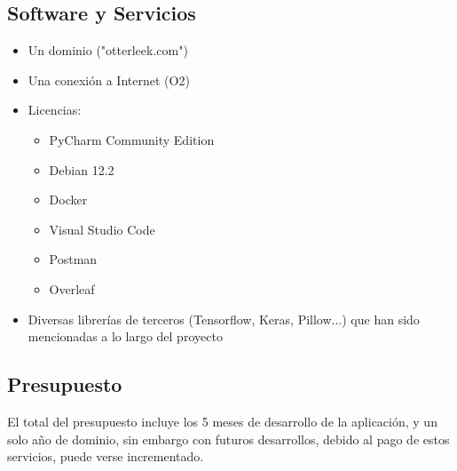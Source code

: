 \documentclass{article}
\begin{document}
\subsection{Software y Servicios}
\begin{itemize}
	\item Un dominio ("otterleek.com")
	\item Una conexión a Internet (O2)
	\item Licencias:
	\begin{itemize}
    	\item PyCharm Community Edition
    	\item Debian 12.2
    	\item Docker
    	\item Visual Studio Code
    	\item Postman
    	\item Overleaf
	\end{itemize}
	\item Diversas librerías de terceros (Tensorflow, Keras, Pillow...) que han sido mencionadas a lo largo del proyecto
\end{itemize}
\newpage

\subsection{Presupuesto}

El total del presupuesto incluye los 5 meses de desarrollo de la aplicación, y un solo año de dominio, sin embargo con futuros desarrollos, debido al pago de estos servicios, puede verse incrementado.
\end{document}
